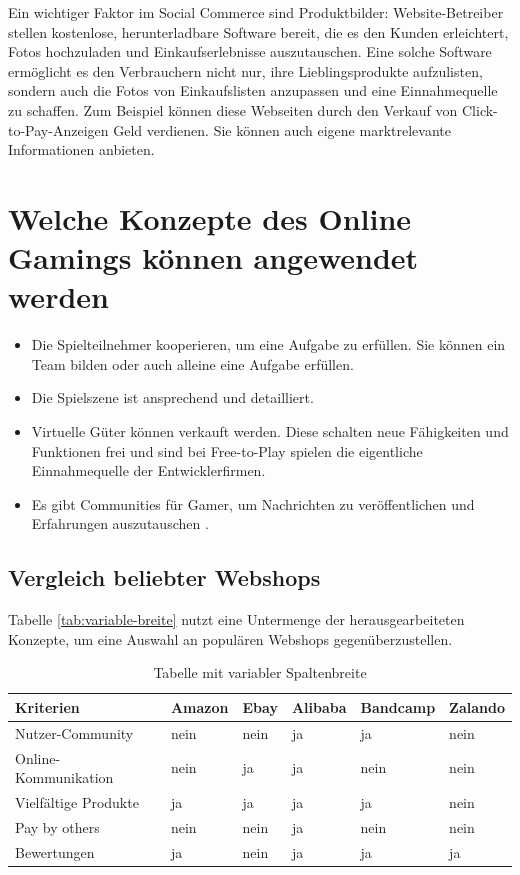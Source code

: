 \begin{itemize}
\end{itemize}

Ein wichtiger Faktor im Social Commerce sind Produktbilder: Website-Betreiber stellen kostenlose, herunterladbare Software bereit, die es den Kunden erleichtert, Fotos hochzuladen und Einkaufserlebnisse auszutauschen. Eine solche Software ermöglicht es den Verbrauchern nicht nur, ihre Lieblingsprodukte aufzulisten, sondern auch die Fotos von Einkaufslisten anzupassen und eine Einnahmequelle zu schaffen. Zum Beispiel können diese Webseiten durch den Verkauf von Click-to-Pay-Anzeigen Geld verdienen. Sie können auch eigene marktrelevante Informationen anbieten.


\section{Welche Konzepte des Online Gamings können angewendet werden}

\begin{itemize}
\item Die Spielteilnehmer kooperieren, um eine Aufgabe zu erfüllen. Sie können ein Team bilden oder auch alleine eine Aufgabe erfüllen.
\item Die Spielszene ist ansprechend und detailliert.
\item Virtuelle Güter können verkauft werden. Diese schalten neue Fähigkeiten und Funktionen frei und sind bei Free-to-Play spielen die eigentliche Einnahmequelle der Entwicklerfirmen.
\item Es gibt Communities für Gamer, um Nachrichten zu veröffentlichen und Erfahrungen auszutauschen \parencite[S. 126]{warmelink}.
\end{itemize}


\subsection{Vergleich beliebter Webshops}

Tabelle \vref{tab:variable-breite} nutzt eine Untermenge der herausgearbeiteten Konzepte, um eine Auswahl an populären Webshops gegenüberzustellen.

\begin{table}[htbp]
\centering
\begin{tabular}{l l l l l l}
\toprule
Kriterien				& Amazon	& Ebay	& Alibaba	& Bandcamp	& Zalando\\
\midrule
Nutzer-Community		& nein		& nein	& ja		& ja		& nein\\
Online-Kommunikation	& nein		& ja	& ja		& nein		& nein\\
Vielfältige Produkte	& ja		& ja	& ja		& ja		& nein\\
Pay by others			& nein		& nein	& ja		& nein		& nein\\
Bewertungen				& ja		& nein	& ja		& ja		& ja\\
\bottomrule
\end{tabular}
\caption{Tabelle mit variabler Spaltenbreite}
\label{tab:variable-breite}
\end{table}

